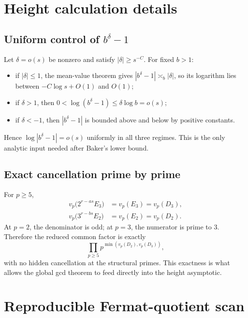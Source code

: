 \documentclass[11pt,oneside]{article}
\theoremstyle{definition}
\begin{document}
\section{Height calculation details}\label{app:height}

\subsection{Uniform control of $b^\delta-1$}

Let $\delta=o(s)$ be nonzero and satisfy $|\delta|\ge s^{-C}$.  For fixed
$b>1$:
\begin{itemize}
  \item if $|\delta|\le1$, the mean-value theorem gives
        $|b^\delta-1|\asymp_b|\delta|$, so its logarithm lies between
        $-C\log s+O(1)$ and $O(1)$;
  \item if $\delta>1$, then
        $0<\log(b^\delta-1)\le\delta\log b=o(s)$;
  \item if $\delta<-1$, then $|b^\delta-1|$ is bounded above and below by
        positive constants.
\end{itemize}
Hence $\log|b^\delta-1|=o(s)$ uniformly in all three regimes.  This is the
only analytic input needed after Baker's lower bound.

\subsection{Exact cancellation prime by prime}

For $p\ge5$,
\begin{align*}
 v_p\bigl(2^{r-as}E_3\bigr)&=v_p(E_3)=v_p(D_3),\\
 v_p\bigl(3^{r-bs}E_2\bigr)&=v_p(E_2)=v_p(D_2).
\end{align*}
At $p=2$, the denominator is odd; at $p=3$, the numerator is prime to $3$.
Therefore the reduced common factor is exactly
\[
  \prod_{p\ge5}p^{\min(v_p(D_2),v_p(D_3))},
\]
with no hidden cancellation at the structural primes.  This exactness is
what allows the global gcd theorem to feed directly into the height
asymptotic.

\section{Reproducible Fermat-quotient scan}\label{app:python}
\end{document}
